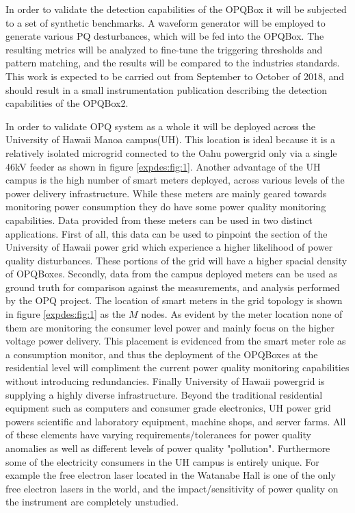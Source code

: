 In order to validate the detection capabilities of the OPQBox it will be subjected to a set of synthetic benchmarks. A waveform generator will be employed to generate various PQ desturbances, which will be fed into the OPQBox. The resulting metrics will be analyzed to fine-tune the triggering thresholds and pattern matching, and the results will be compared to the industries standards. This work is expected to be carried out from September to October of 2018, and should result in a small instrumentation publication describing the detection capabilities of the OPQBox2.

In order to validate OPQ system as a whole it will be deployed across the University of Hawaii Manoa campus(UH). This location is ideal because it is a relatively isolated microgrid connected to the Oahu powergrid only via a single 46kV feeder as shown in figure \ref{expdes:fig:1}. Another advantage of the UH campus is the high number of smart meters deployed, across various levels of the power delivery infrastructure. While these meters are mainly geared towards monitoring power consumption they do have some power quality monitoring capabilities. Data provided from these meters can be used in two distinct applications. First of all, this data can be used to pinpoint the section of the University of Hawaii power grid which experience a higher likelihood of power quality disturbances. These portions of the grid will have a higher spacial density of OPQBoxes. Secondly, data from the campus deployed meters can be used as ground truth for comparison against the measurements, and analysis performed by the OPQ project. The location of smart meters in the grid topology is shown in figure \ref{expdes:fig:1} as the $M$ nodes. As evident by the meter location none of them are monitoring the consumer level power and mainly focus on the higher voltage power delivery. This placement is evidenced from the smart meter role as a consumption monitor, and thus the deployment of the OPQBoxes at the residential level will compliment the current power quality monitoring capabilities without introducing redundancies. Finally University of Hawaii powergrid is supplying a highly diverse infrastructure. Beyond the traditional residential equipment such as computers and consumer grade electronics, UH power grid powers scientific and laboratory equipment, machine shops, and server farms. All of these elements have varying requirements/tolerances for power quality anomalies as well as different levels of power quality "pollution". Furthermore some of the electricity consumers in the UH campus is entirely unique. For example the free electron laser located in the Watanabe Hall is one of the only free electron lasers in the world, and the impact/sensitivity of power quality on the instrument are completely unstudied.
